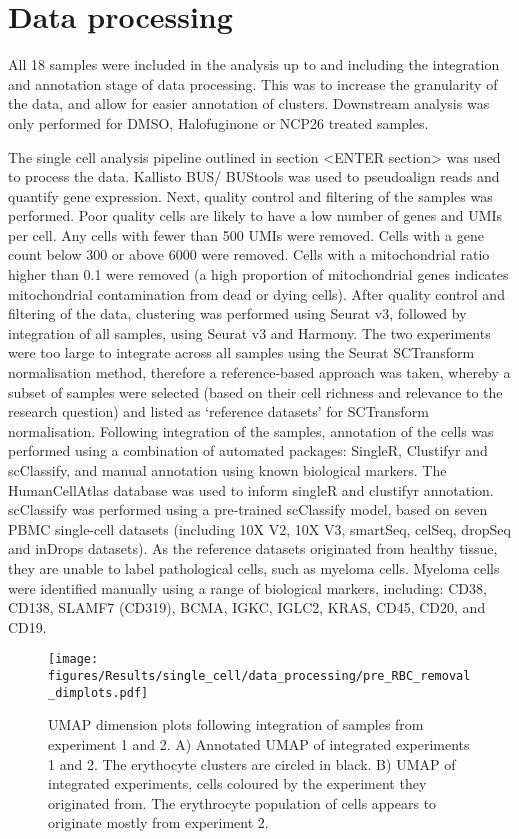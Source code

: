 \section{Data processing}
All 18 samples were included in the analysis up to and including the integration and annotation stage of data processing.
This was to increase the granularity of the data, and allow for easier annotation of clusters.
Downstream analysis was only performed for DMSO, Halofuginone or NCP26 treated samples.


The single cell analysis pipeline outlined in section <ENTER section> was used to process the data.
Kallisto BUS/ BUStools was used to pseudoalign reads and quantify gene expression.
Next, quality control and filtering of the samples was performed.
Poor quality cells are likely to have a low number of genes and UMIs per cell.
Any cells with fewer than 500 UMIs were removed.
Cells with a gene count below 300 or above 6000 were removed.
Cells with a mitochondrial ratio higher than 0.1 were removed (a high proportion of mitochondrial genes indicates mitochondrial contamination from dead or dying cells).
After quality control and filtering of the data, clustering was performed using Seurat v3, followed by integration of all samples, using Seurat v3 and Harmony.
The two experiments were too large to integrate across all samples using the Seurat SCTransform normalisation method, therefore a reference-based approach was taken, whereby a subset of samples were selected (based on their cell richness and relevance to the research question) and listed as `reference datasets' for SCTransform normalisation.
Following integration of the samples, annotation of the cells was performed using a combination of automated packages: SingleR, Clustifyr and scClassify, and manual annotation using known biological markers.
The HumanCellAtlas database was used to inform singleR and clustifyr annotation.
scClassify was performed using a pre-trained scClassify model, based on seven PBMC single-cell datasets (including 10X V2, 10X V3, smartSeq, celSeq, dropSeq and inDrops datasets).
As the reference datasets originated from healthy tissue, they are unable to label pathological cells, such as myeloma cells.
Myeloma cells were identified manually using a range of biological markers, including: CD38, CD138, SLAMF7 (CD319), BCMA, IGKC, IGLC2, KRAS, CD45, CD20, and CD19.

\begin{figure}[htb]
    \centering
    \texttt{[image: figures/Results/single\_cell/data\_processing/pre\_RBC\_removal\_dimplots.pdf]}
    \caption[Integrated experiments pre-erythrocyte removal]{UMAP dimension plots following integration of samples from experiment 1 and 2.
    A) Annotated UMAP of integrated experiments 1 and 2. The erythocyte clusters are circled in black.
    B) UMAP of integrated experiments, cells coloured by the experiment they originated from. The erythrocyte population of cells appears to originate mostly from experiment 2. }
    \label{fig:umap_pre_RBC}
\end{figure}

